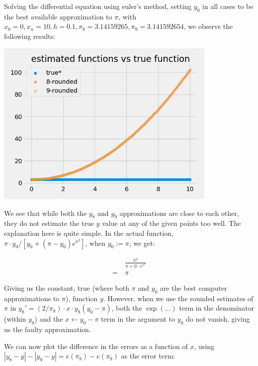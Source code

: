 Solving the differential equation using euler's method, setting $y_0$ in all cases to be the best available approximation to $\pi$, with $x_0 = 0, x_n = 10, h = 0.1, \pi_8 = 3.14159265, \pi_9 = 3.141592654$, we observe the following results:

\begin{center}
	\includegraphics*[width=0.8\textwidth]{res/2.1-plots.png}
\end{center}

We see that while both the $y_8$ and $y_9$ approximations are close to each other, they do not estimate the true $y$ value at any of the given points too well. The explanation here is quite simple. In the actual function, $\pi\cdot y_0/[y_0 + (\pi - y_0)e^{x^2}]$, when $y_0 := \pi$, we get:

\begin{align*}
	&\frac{\pi^2}{\pi + 0\cdot e^{x^2}}\\
	=\ &\pi
\end{align*}

Giving us the constant, true (where both $\pi$ and $y_0$ are the best computer approximations to $\pi$), function $y$. However, when we use the rounded estimates of $\pi$ in $y_8' = (2 / \pi_8) \cdot x \cdot y_8(y_0 - \pi)$, both the $\exp(\dots)$ term in the denominator (within $y_8$) and the $x \leftarrow y_0 - \pi$ term in the argument to $y_8$ do not vanish, giving us the faulty approximation.\bigskip

We can now plot the difference in the errors as a function of $x$, using $|y_8 - y| - |y_9 - y| = e(\pi_8) - e(\pi_9)$ as the error term:

